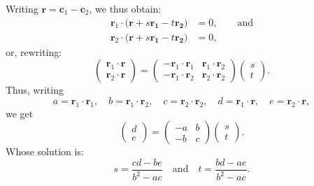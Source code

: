 \documentclass{article}
\renewcommand{\vec}[1]{\mathbf{#1}}
\begin{document}
Writing $\vec{r} = \vec{c}_1 - \vec{c}_2$, we thus obtain:
\begin{equation}
  \begin{split}
    \vec{r}_1\cdot \bigl( \vec{r} + s\vec{r_1} - t\vec{r_2} \bigr)
    &=0, \qquad\text{and} \\
    \vec{r}_2\cdot \bigl( \vec{r} + s\vec{r_1} - t\vec{r_2} \bigr) &=0,
  \end{split}
\end{equation}
or, rewriting:
\begin{equation}
  \begin{pmatrix}
    \vec{r}_1\cdot\vec{r} \\
    \vec{r}_2\cdot\vec{r} 
  \end{pmatrix} =   
  \begin{pmatrix}
    -\vec{r}_1\cdot\vec{r}_1 & \vec{r}_1\cdot\vec{r}_2 \\
    -\vec{r}_1\cdot\vec{r}_2 & \vec{r}_2\cdot\vec{r}_2 
  \end{pmatrix}
  \begin{pmatrix}
    s \\
    t
  \end{pmatrix}.
\end{equation}
Thus, writing
\begin{equation}
  a = \vec{r}_1\cdot\vec{r}_1,\quad
  b = \vec{r}_1\cdot\vec{r}_2,\quad
  c = \vec{r}_2\cdot\vec{r}_2,\quad
  d = \vec{r}_1\cdot\vec{r},\quad
  e = \vec{r}_2\cdot\vec{r},
\end{equation}
we get
\begin{equation}
  \begin{pmatrix}
    d \\ e
  \end{pmatrix} =   
  \begin{pmatrix}
    -a & b \\
    -b & c
  \end{pmatrix}
  \begin{pmatrix}
    s \\
    t
  \end{pmatrix}.
\end{equation}
Whose solution is:
\begin{equation}
  s = \frac{cd-be}{b^2-ac}\quad\text{and}\quad t = \frac{bd-ae}{b^2-ac}.
\end{equation}
\end{document}
